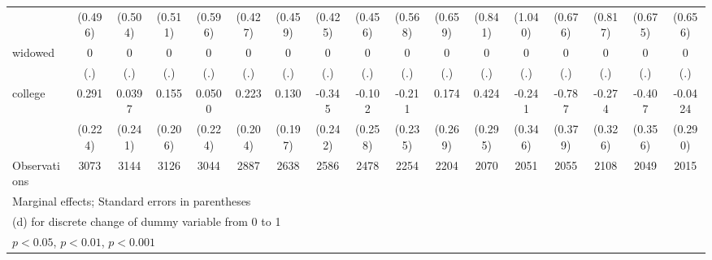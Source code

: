 {\begin{tabular}{l*{16}{c}}
                    &     (0.496)         &     (0.504)         &     (0.511)         &     (0.596)         &     (0.427)         &     (0.459)         &     (0.425)         &     (0.456)         &     (0.568)         &     (0.659)         &     (0.841)         &     (1.040)         &     (0.676)         &     (0.817)         &     (0.675)         &     (0.656)         \\
[1em]
widowed             &           0         &           0         &           0         &           0         &           0         &           0         &           0         &           0         &           0         &           0         &           0         &           0         &           0         &           0         &           0         &           0         \\
                    &         (.)         &         (.)         &         (.)         &         (.)         &         (.)         &         (.)         &         (.)         &         (.)         &         (.)         &         (.)         &         (.)         &         (.)         &         (.)         &         (.)         &         (.)         &         (.)         \\
[1em]
college             &       0.291         &      0.0397         &       0.155         &      0.0500         &       0.223         &       0.130         &      -0.345         &      -0.102         &      -0.211         &       0.174         &       0.424         &      -0.241         &      -0.787\sym{*}  &      -0.274         &      -0.407         &     -0.0424         \\
                    &     (0.224)         &     (0.241)         &     (0.206)         &     (0.224)         &     (0.204)         &     (0.197)         &     (0.242)         &     (0.258)         &     (0.235)         &     (0.269)         &     (0.295)         &     (0.346)         &     (0.379)         &     (0.326)         &     (0.356)         &     (0.290)         \\
\hline
Observations        &        3073         &        3144         &        3126         &        3044         &        2887         &        2638         &        2586         &        2478         &        2254         &        2204         &        2070         &        2051         &        2055         &        2108         &        2049         &        2015         \\
\hline\hline
\multicolumn{17}{l}{\footnotesize Marginal effects; Standard errors in parentheses}\\
\multicolumn{17}{l}{\footnotesize  (d) for discrete change of dummy variable from 0 to 1}\\
\multicolumn{17}{l}{\footnotesize \sym{*} \(p<0.05\), \sym{**} \(p<0.01\), \sym{***} \(p<0.001\)}\\
\end{tabular}
}
